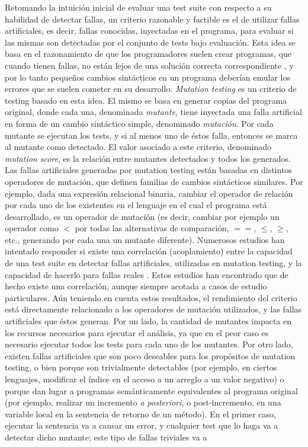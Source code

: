 Retomando la intuici\'on inicial de evaluar una test suite con respecto a su habilidad de detectar fallas, un criterio razonable y factible es el de utilizar fallas artificiales, es decir, fallas conocidas, inyectadas en el programa, para evaluar si las mismas son detectadas por el conjunto de tests bajo evaluaci\'on. Esta idea se basa en el razonamiento de que los programadores suelen crear programas, que cuando tienen fallas, no est\'an lejos de una soluci\'on correcta correspondiente \cite{bibliography.mutation.DeMillo}, y por lo tanto peque\~nos cambios sint\'acticos en un programa deber\'ian emular los errores que se suelen cometer en su desarrollo. \emph{Mutation testing} es un criterio de testing basado en esta idea. El mismo se basa en generar copias del programa original, donde cada una, denominada \emph{mutante}, tiene inyectada una falla artificial en forma de un cambio sint\'actico simple, denominado \emph{mutaci\'on}. Por cada mutante se ejecutan los tests, y si al menos uno de \'estos falla, entonces se marca al mutante como detectado. El valor asociado a este criterio, denominado \emph{mutation score}, es la relaci\'on entre mutantes detectados y todos los generados. Las fallas artificiales generadas por mutation testing est\'an basadas en distintos operadores de mutaci\'on, que definen familias de cambios sint\'acticos similares. Por ejemplo, dada una expresi\'on relacional binaria, cambiar el operador de relaci\'on por cada uno de los existentes en el lenguaje en el cual el programa est\'a desarrollado, es un operador de mutaci\'on (es decir, cambiar por ejemplo un operador como $<$ por todas las alternativas de comparaci\'on, $==$, $\le$, $\ge$, etc., generando por cada una un mutante diferente). Numerosos estudios han intentado responder si existe una correlaci\'on (acoplamiento) entre la capacidad de una test suite en detectar fallas artificiales, utilizadas en mutation testing, y la capacidad de hacerlo para fallas reales \cite{bibliography.mutation.evaluation.coupling.Offutt89, bibliography.mutation.evaluation.coupling.Offutt92, bibliography.mutation.evaluation.HAndrews05, bibliography.mutation.evaluation.valid-substitute}. Estos estudios han encontrado que de hecho existe una correlaci\'on, aunque siempre acotada a casos de estudio particulares. A\'un teniendo en cuenta estos resultados, el rendimiento del criterio est\'a directamente relacionado a los operadores de mutaci\'on utilizados, y las fallas artificiales que \'estos generan. Por un lado, la cantidad de mutantes impacta en los recursos necesarios para ejecutar el an\'alisis, ya que en el peor caso es necesario ejecutar todos los tests para cada uno de los mutantes. Por otro lado, existen fallas artificiales que son poco deseables para los prop\'ositos de mutation testing, o bien porque son trivialmente detectables (por ejemplo, en ciertos lenguajes, modificar el \'indice en el acceso a un arreglo a un valor negativo) o porque dan lugar a programas sem\'anticamente equivalentes al programa original (por ejemplo, realizar un incremento \emph{a posteriori}, o post-incremento, en una variable local en la sentencia de retorno de un m\'etodo). En el primer caso, ejecutar la sentencia va a causar un error, y cualquier test que lo haga va a detectar dicho mutante; este tipo de fallas triviales va a 